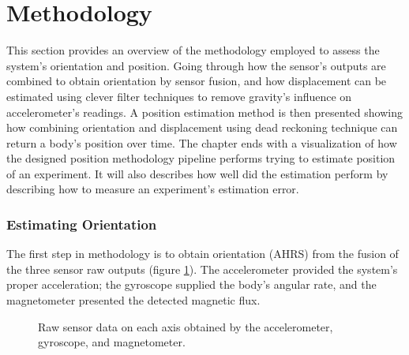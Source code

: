 \section{Methodology}
\label{sub:methodology}

This section provides an overview of the methodology employed to assess the system's orientation and position. Going through how the sensor's outputs are combined to obtain orientation by sensor fusion, and how displacement can be estimated using clever filter techniques to remove gravity's influence on accelerometer's readings. A position estimation method is then presented showing how combining orientation and displacement using dead reckoning technique can return a body's position over time. The chapter ends with a visualization of how the designed position methodology pipeline performs trying to estimate position of an experiment. It will also describes how well did the estimation perform by describing how to measure an experiment's estimation error.


\subsubsection{Estimating Orientation}

The first step in methodology is to obtain orientation (AHRS) from the fusion of the three sensor raw outputs (figure \ref{fig:raw}). The accelerometer provided the system's proper acceleration; the gyroscope supplied the body's angular rate, and the magnetometer presented the detected magnetic flux.

\begin{figure}[!h]
    \centering
    \resizebox{0.75\linewidth}{!}{}
    \caption{Raw sensor data on each axis obtained by the accelerometer, gyroscope, and magnetometer.}
    \label{fig:raw}
\end{figure}

